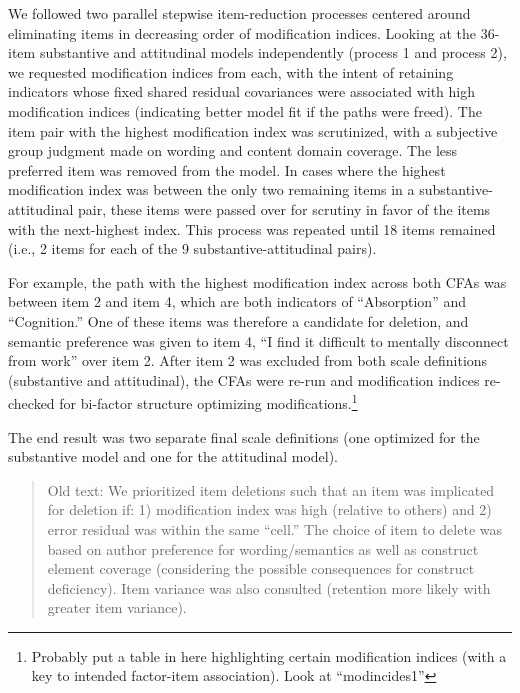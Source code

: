 \documentclass[
  english,
  man]{apa7}
\begin{document}
We followed two parallel stepwise item-reduction processes centered around eliminating items in decreasing order of modification indices. Looking at the 36-item substantive and attitudinal models independently (process 1 and process 2), we requested modification indices from each, with the intent of retaining indicators whose fixed shared residual covariances were associated with high modification indices (indicating better model fit if the paths were freed). The item pair with the highest modification index was scrutinized, with a subjective group judgment made on wording and content domain coverage. The less preferred item was removed from the model. In cases where the highest modification index was between the only two remaining items in a substantive-attitudinal pair, these items were passed over for scrutiny in favor of the items with the next-highest index. This process was repeated until 18 items remained (i.e., 2 items for each of the 9 substantive-attitudinal pairs).

For example, the path with the highest modification index across both CFAs was between item 2 and item 4, which are both indicators of ``Absorption'' and ``Cognition.'' One of these items was therefore a candidate for deletion, and semantic preference was given to item 4, ``I find it difficult to mentally disconnect from work'' over item 2. After item 2 was excluded from both scale definitions (substantive and attitudinal), the CFAs were re-run and modification indices re-checked for bi-factor structure optimizing modifications.\footnote{Probably put a table in here highlighting certain modification indices (with a key to intended factor-item association). Look at ``modincides1''}

The end result was two separate final scale definitions (one optimized for the substantive model and one for the attitudinal model).

\begin{quote}
Old text: We prioritized item deletions such that an item was implicated for deletion if: 1) modification index was high (relative to others) and 2) error residual was within the same ``cell.'' The choice of item to delete was based on author preference for wording/semantics as well as construct element coverage (considering the possible consequences for construct deficiency). Item variance was also consulted (retention more likely with greater item variance).
\end{quote}
\end{document}
